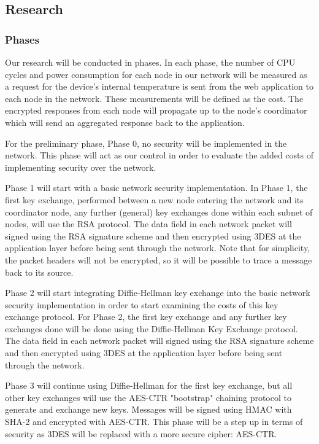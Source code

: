 \documentclass[tikz,a4paper,titlepage]{article}
\begin{document}
\subsection{Research}

\subsubsection{Phases}

Our research will be conducted in phases. In each phase, the number of CPU cycles and power consumption for each node in our network will be measured as a request for the device's internal temperature is sent from the web application to each node in the network. These measurements will be defined as the cost. The encrypted responses from each node will propagate up to the node's coordinator which will send an aggregated response back to the application. 

For the preliminary phase, Phase 0, no security will be implemented in the network. This phase will act as our control in order to evaluate the added costs of implementing security over the network.

Phase 1 will start with a basic network security implementation. In Phase 1, the first key exchange, performed between a new node entering the network and its coordinator node, any further (general) key exchanges done within each subnet of nodes, will use the RSA protocol. The data field in each network packet will signed using the RSA signature scheme and then encrypted using 3DES at the application layer before being sent through the network. Note that for simplicity, the packet headers will not be encrypted, so it will be possible to trace a message back to its source.

Phase 2 will start integrating Diffie-Hellman key exchange into the basic network security implementation in order to start examining the costs of this key exchange protocol. For Phase 2, the first key exchange and any further key exchanges done will be done using the Diffie-Hellman Key Exchange protocol. The data field in each network packet will signed using the RSA signature scheme and then encrypted using 3DES at the application layer before being sent through the network.

Phase 3 will continue using Diffie-Hellman for the first key exchange, but all other key exchanges will use the AES-CTR "bootstrap" chaining protocol to generate and exchange new keys. Messages will be signed using HMAC with SHA-2 and encrypted with AES-CTR. This phase will be a step up in terms of security as 3DES will be replaced with a more secure cipher: AES-CTR. 
\end{document}
